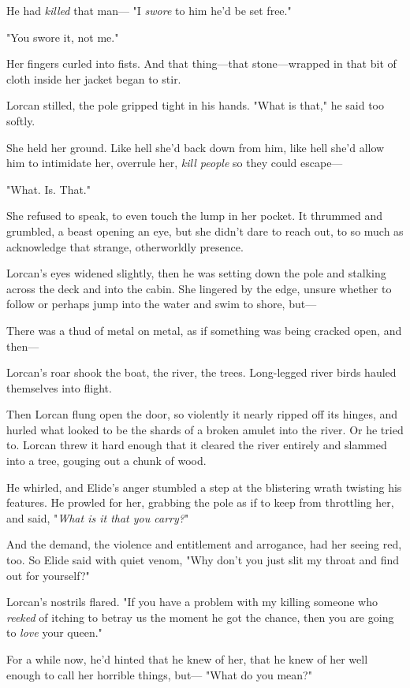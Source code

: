 He had \emph{killed} that man--- "I \emph{swore} to him he'd be set free."

"You swore it, not me."

Her fingers curled into fists.
And that thing---that stone---wrapped in that bit of cloth inside her jacket began to stir.

Lorcan stilled, the pole gripped tight in his hands.
"What is that," he said too softly.

She held her ground.
Like hell she'd back down from him, like hell she'd allow him to intimidate her, overrule her, \emph{kill people} so they could escape---

"What.
Is.
That."

She refused to speak, to even touch the lump in her pocket.
It thrummed and grumbled, a beast opening an eye, but she didn't dare to reach out, to so much as acknowledge that strange, otherworldly presence.

Lorcan's eyes widened slightly, then he was setting down the pole and stalking across the deck and into the cabin.
She lingered by the edge, unsure whether to follow or perhaps jump into the water and swim to shore, but---

There was a thud of metal on metal, as if something was being cracked open, and then---

Lorcan's roar shook the boat, the river, the trees.
Long-legged river birds hauled themselves into flight.

Then Lorcan flung open the door, so violently it nearly ripped off its hinges, and hurled what looked to be the shards of a broken amulet into the river.
Or he tried to.
Lorcan threw it hard enough that it cleared the river entirely and slammed into a tree, gouging out a chunk of wood.

He whirled, and Elide's anger stumbled a step at the blistering wrath twisting his features.
He prowled for her, grabbing the pole as if to keep from throttling her, and said, "\emph{What is it that you carry?}"

And the demand, the violence and entitlement and arrogance, had her seeing red, too.
So Elide said with quiet venom, "Why don't you just slit my throat and find out for yourself?"

Lorcan's nostrils flared.
"If you have a problem with my killing someone who \emph{reeked} of itching to betray us the moment he got the chance, then you are going to \emph{love} your queen."

For a while now, he'd hinted that he knew of her, that he knew of her well enough to call her horrible things, but--- "What do you mean?"

